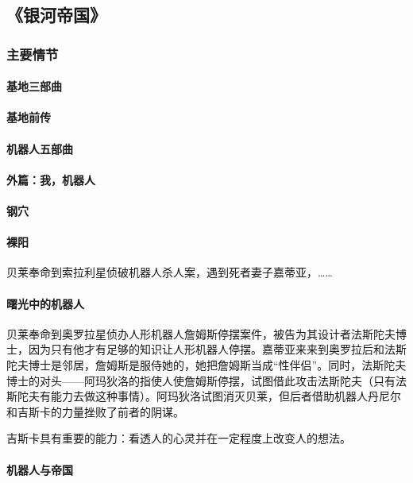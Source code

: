\subsection{《银河帝国》}
\subsubsection{主要情节}
\paragraph{基地三部曲}

\paragraph{基地前传}

\paragraph{机器人五部曲}

\paragraph{外篇：我，机器人}

\paragraph{钢穴}

\paragraph{裸阳}

贝莱奉命到索拉利星侦破机器人杀人案，遇到死者妻子嘉蒂亚，……

\paragraph{曙光中的机器人}

贝莱奉命到奥罗拉星侦办人形机器人詹姆斯停摆案件，被告为其设计者法斯陀夫博士，因为只有他才有足够的知识让人形机器人停摆。嘉蒂亚来来到奥罗拉后和法斯陀夫博士是邻居，詹姆斯是服侍她的，她把詹姆斯当成“性伴侣”。同时，法斯陀夫博士的对头——阿玛狄洛的指使人使詹姆斯停摆，试图借此攻击法斯陀夫（只有法斯陀夫有能力去做这种事情）。阿玛狄洛试图消灭贝莱，但后者借助机器人丹尼尔和吉斯卡的力量挫败了前者的阴谋。

吉斯卡具有重要的能力：看透人的心灵并在一定程度上改变人的想法。

\paragraph{机器人与帝国}

